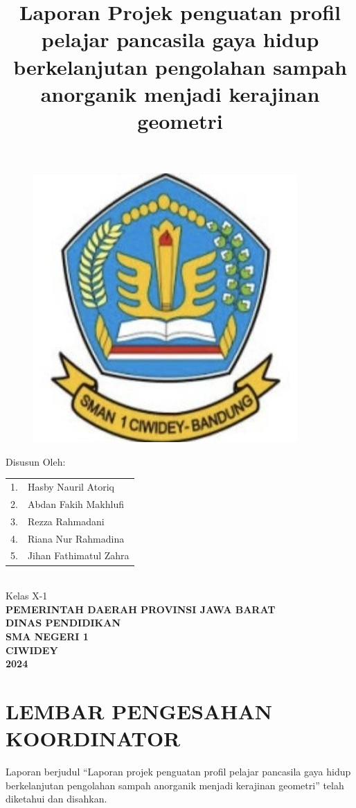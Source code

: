 \documentclass[a4paper,12pt]{article}
\date{}
\title{Laporan Projek penguatan profil pelajar pancasila gaya hidup berkelanjutan pengolahan sampah anorganik menjadi kerajinan geometri}
\begin{document}
\maketitle
\thispagestyle{empty}
\begin{figure}[ht]
    \centering
    \includegraphics[width=0.3\linewidth]{images/sman1.png}
\end{figure}
\vspace{2cm}

\begin{center}
    Disusun Oleh: \\
    \begin{tabular}{ll}
         1.& Hasby Nauril Atoriq  \\
         2.& Abdan Fakih Makhlufi \\
         3.& Rezza Rahmadani \\
         4.& Riana Nur Rahmadina \\
         5.& Jihan Fathimatul Zahra\\
    \end{tabular}\\
    \vspace{0.5cm}
    Kelas X-1\\
    \vspace{1cm}
    \textbf{PEMERINTAH DAERAH PROVINSI JAWA BARAT}\\
    \textbf{DINAS PENDIDIKAN}\\
    \textbf{SMA NEGERI 1}\\
    \textbf{CIWIDEY}\\
    \textbf{2024}
\end{center}
\pagebreak

    \section*{LEMBAR PENGESAHAN KOORDINATOR}
Laporan berjudul “Laporan projek penguatan profil pelajar pancasila gaya hidup berkelanjutan pengolahan sampah anorganik menjadi kerajinan geometri” telah diketahui dan disahkan. 
\vspace{2cm}
\\
\end{document}
